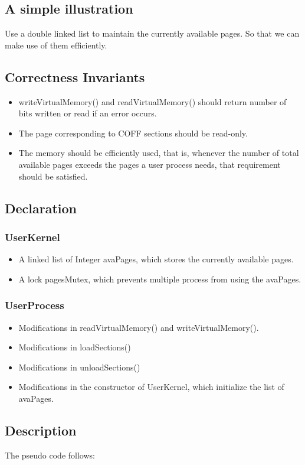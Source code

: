 \documentclass{article}
\begin{document}
	\subsection{A simple illustration}
	Use a double linked list to maintain the currently available pages. So that we can make use of them efficiently.
	\subsection{Correctness Invariants}
	\begin{itemize}
		\item writeVirtualMemory() and readVirtualMemory() should return number of bits written or read if an error occurs.
		\item The page corresponding to COFF sections should be read-only.
		\item The memory should be efficiently used, that is, whenever the number of total available pages exceeds the pages a user process needs, that requirement should be satisfied.
	\end{itemize}
	\subsection{Declaration}
	\subsubsection*{UserKernel}
	\begin{itemize}
		\item A linked list of Integer avaPages, which stores the currently available pages.
		\item A lock pagesMutex, which prevents multiple process from using the avaPages.
	\end{itemize}
	\subsubsection*{UserProcess}
	\begin{itemize}
		\item Modifications in readVirtualMemory() and writeVirtualMemory().
		\item Modifications in loadSections()
		\item Modifications in unloadSections()
		\item Modifications in the constructor of UserKernel, which initialize the list of avaPages.
	\end{itemize}
	
	\subsection{Description}
	The pseudo code follows:
\end{document}
